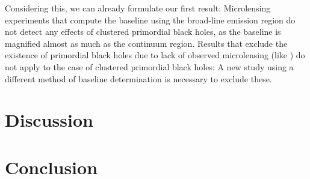 \documentclass{aa}
\begin{document}
Considering this, we can already formulate our first result: Microlensing experiments that compute the baseline using the broad-line emission region do not detect any effects of clustered primordial black holes, as the baseline is magnified almost as much as the continuum region. Results that exclude the existence of primordial black holes due to lack of observed microlensing (like \citet{2017ApJ...836L..18M}) do not apply to the case of clustered primordial black holes: A new study using a different method of baseline determination is necessary to exclude these.
\section{Discussion}

\section{Conclusion}


\end{document}
